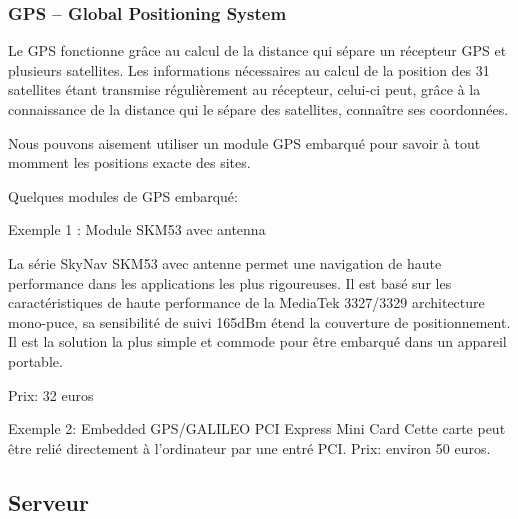 \subsubsection{GPS – Global Positioning System}

Le GPS fonctionne grâce au calcul de la distance qui sépare un récepteur GPS et plusieurs satellites. Les informations nécessaires au calcul de la position des 31 satellites étant transmise régulièrement au récepteur, celui-ci peut, grâce à la connaissance de la distance qui le sépare des satellites, connaître ses coordonnées.

Nous pouvons aisement utiliser un module GPS embarqué pour savoir à tout momment les positions exacte des sites.

Quelques modules de GPS embarqué:

Exemple 1 : Module SKM53 avec antenna

\begin{figure}
\begin{center}


\end{center}
\end{figure}

La série SkyNav SKM53 avec antenne permet une navigation de haute performance dans les applications les plus rigoureuses.
Il est basé sur les caractéristiques de haute performance de la MediaTek 3327/3329 architecture mono-puce, sa sensibilité de suivi 165dBm étend la couverture de positionnement. Il est la solution la plus simple et commode pour être embarqué dans un appareil portable.

Prix: 32 euros

Exemple 2: Embedded GPS/GALILEO PCI Express Mini Card
Cette carte peut être relié directement à l'ordinateur par une entré PCI.
Prix: environ 50 euros.

\subsection{Serveur}
\vfill
\pagebreak
